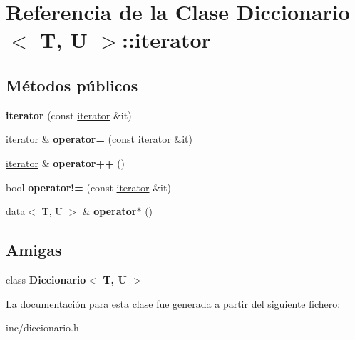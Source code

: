 \hypertarget{classDiccionario_1_1iterator}{}\section{Referencia de la Clase Diccionario$<$ T, U $>$\+:\+:iterator}
\label{classDiccionario_1_1iterator}
\subsection*{Métodos públicos}
\begin{DoxyCompactItemize}
\item 
\mbox{\label{classDiccionario_1_1iterator_aad7992e257dbf3011d658260417c2a3d}} 
{\bfseries iterator} (const \hyperlink{classDiccionario_1_1iterator}{iterator} \&it)
\item 
\mbox{\label{classDiccionario_1_1iterator_aaa47e370e582b831151dfb20849c9f68}} 
\hyperlink{classDiccionario_1_1iterator}{iterator} \& {\bfseries operator=} (const \hyperlink{classDiccionario_1_1iterator}{iterator} \&it)
\item 
\mbox{\label{classDiccionario_1_1iterator_aaf5fab050eb47cf1cb68f94d7335c33f}} 
\hyperlink{classDiccionario_1_1iterator}{iterator} \& {\bfseries operator++} ()
\item 
\mbox{\label{classDiccionario_1_1iterator_a9b175cb337822146e6baeb633f431f5b}} 
bool {\bfseries operator!=} (const \hyperlink{classDiccionario_1_1iterator}{iterator} \&it)
\item 
\mbox{\label{classDiccionario_1_1iterator_a5961198de25d3a3e72b41ddb2bab9a3b}} 
\hyperlink{structdata}{data}$<$ T, U $>$ \& {\bfseries operator$\ast$} ()
\end{DoxyCompactItemize}
\subsection*{Amigas}
\begin{DoxyCompactItemize}
\item 
\mbox{\label{classDiccionario_1_1iterator_ae50c4dcf749ac5c49596da52815dfa85}} 
class {\bfseries Diccionario$<$ T, U $>$}
\end{DoxyCompactItemize}


La documentación para esta clase fue generada a partir del siguiente fichero\+:\begin{DoxyCompactItemize}
\item 
inc/diccionario.\+h\end{DoxyCompactItemize}
